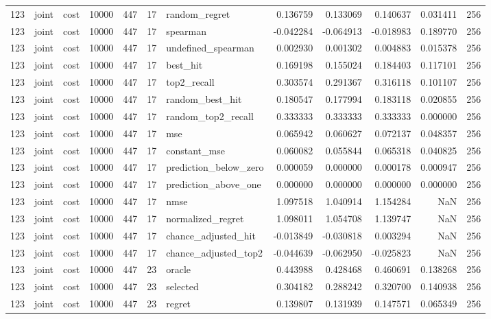\begin{tabular}{rllrrrlrrrrr}
123 & joint & cost & 10000 & 447 & 17 & random_regret & 0.136759 & 0.133069 & 0.140637 & 0.031411 & 256 \\
123 & joint & cost & 10000 & 447 & 17 & spearman & -0.042284 & -0.064913 & -0.018983 & 0.189770 & 256 \\
123 & joint & cost & 10000 & 447 & 17 & undefined_spearman & 0.002930 & 0.001302 & 0.004883 & 0.015378 & 256 \\
123 & joint & cost & 10000 & 447 & 17 & best_hit & 0.169198 & 0.155024 & 0.184403 & 0.117101 & 256 \\
123 & joint & cost & 10000 & 447 & 17 & top2_recall & 0.303574 & 0.291367 & 0.316118 & 0.101107 & 256 \\
123 & joint & cost & 10000 & 447 & 17 & random_best_hit & 0.180547 & 0.177994 & 0.183118 & 0.020855 & 256 \\
123 & joint & cost & 10000 & 447 & 17 & random_top2_recall & 0.333333 & 0.333333 & 0.333333 & 0.000000 & 256 \\
123 & joint & cost & 10000 & 447 & 17 & mse & 0.065942 & 0.060627 & 0.072137 & 0.048357 & 256 \\
123 & joint & cost & 10000 & 447 & 17 & constant_mse & 0.060082 & 0.055844 & 0.065318 & 0.040825 & 256 \\
123 & joint & cost & 10000 & 447 & 17 & prediction_below_zero & 0.000059 & 0.000000 & 0.000178 & 0.000947 & 256 \\
123 & joint & cost & 10000 & 447 & 17 & prediction_above_one & 0.000000 & 0.000000 & 0.000000 & 0.000000 & 256 \\
123 & joint & cost & 10000 & 447 & 17 & nmse & 1.097518 & 1.040914 & 1.154284 & NaN & 256 \\
123 & joint & cost & 10000 & 447 & 17 & normalized_regret & 1.098011 & 1.054708 & 1.139747 & NaN & 256 \\
123 & joint & cost & 10000 & 447 & 17 & chance_adjusted_hit & -0.013849 & -0.030818 & 0.003294 & NaN & 256 \\
123 & joint & cost & 10000 & 447 & 17 & chance_adjusted_top2 & -0.044639 & -0.062950 & -0.025823 & NaN & 256 \\
123 & joint & cost & 10000 & 447 & 23 & oracle & 0.443988 & 0.428468 & 0.460691 & 0.138268 & 256 \\
123 & joint & cost & 10000 & 447 & 23 & selected & 0.304182 & 0.288242 & 0.320700 & 0.140938 & 256 \\
123 & joint & cost & 10000 & 447 & 23 & regret & 0.139807 & 0.131939 & 0.147571 & 0.065349 & 256 \\

\end{tabular}

